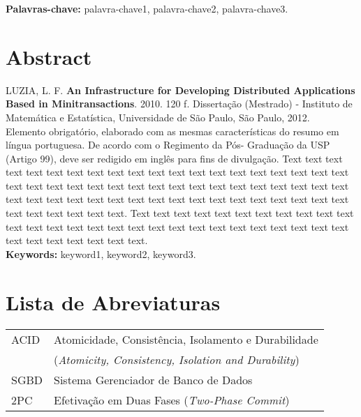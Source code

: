 \documentclass[11pt,twoside,a4paper]{book}
\begin{document}
\noindent \textbf{Palavras-chave:} palavra-chave1, palavra-chave2, palavra-chave3.

\chapter*{Abstract}
\noindent LUZIA, L. F. \textbf{An Infrastructure for Developing Distributed Applications Based in Minitransactions}. 
2010. 120 f.
Dissertação (Mestrado) - Instituto de Matemática e Estatística,
Universidade de São Paulo, São Paulo, 2012.
\\


Elemento obrigatório, elaborado com as mesmas características do resumo em
língua portuguesa. De acordo com o Regimento da Pós- Graduação da USP (Artigo
99), deve ser redigido em inglês para fins de divulgação. 
Text text text text text text text text text text text text text text text text
text text text text text text text text text text text text text text text text
text text text text text text text text text text text text text text text text
text text text text text text text text text text text text.
Text text text text text text text text text text text text text text text text
text text text text text text text text text text text text text text text text
text text text.
\\

\noindent \textbf{Keywords:} keyword1, keyword2, keyword3.

\tableofcontents

\chapter{Lista de Abreviaturas}
\begin{tabular}{ll}
	ACID		& Atomicidade, Consistência, Isolamento e Durabilidade \\
			& (\emph{Atomicity, Consistency, Isolation and Durability})\\
        SGBD	& Sistema Gerenciador de Banco de Dados\\
	2PC		& Efetivação em Duas Fases (\emph{Two-Phase Commit})\\
\end{tabular}

\listoffigures
\listoftables

\mainmatter

\fancyhead[RE,LO]{\thesection}

\singlespacing              %
\end{document}
